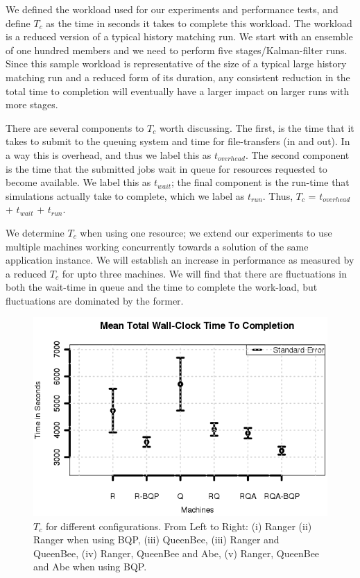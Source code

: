 \documentclass{sig-alternate}
\newcommand{\tc}{$T_c$ }
\newcommand{\up}{\vspace*{-0.3em}}
\begin{document}
We defined the workload used for our experiments and performance tests, and define \tc as the time in seconds it takes to complete this workload. The workload is a reduced version of a typical history matching run. We start with an ensemble of one hundred members and we need to perform five stages/Kalman-filter runs. Since this sample workload is representative of the size of a typical large history matching run and a reduced form of its duration, any consistent reduction in the total time to completion will eventually have a larger impact on larger runs with more stages.

There are several components to \tc worth discussing. The first, is the time that it takes to submit to the queuing system and time for file-transfers (in and out). In a way this is overhead, and thus we label this as $t_{overhead}$.  The second component is the time that the submitted jobs wait in queue for resources requested to become available. We label this as $t_{wait}$; the final component is the run-time that simulations actually take to complete, which we label as $t_{run}$. Thus, \tc = $t_{overhead}$ + $t_{wait}$ + $t_{run}$.

We determine \tc when using one resource; we extend our experiments to use multiple machines working concurrently towards a solution of the same application instance. We will establish an increase in performance as measured by a reduced \tc for upto three machines.  We will find that there are fluctuations in both the wait-time in queue and the time to complete the work-load, but fluctuations are dominated by the former.

\begin{figure}
\begin{center}
\includegraphics[scale=0.5]{./figures/Figure7.png}
\end{center}
\up\up\up\up\up\up\up\up\up
\caption{\tc for different configurations.  From Left to Right: (i)
  Ranger (ii) Ranger when using BQP, (iii) QueenBee, (iii) Ranger
  and QueenBee, (iv) Ranger, QueenBee and Abe, (v) Ranger, QueenBee 
  and Abe when using BQP.}
\label{fig:results}
\up\up\up\up\up\up
\end{figure}
\end{document}
